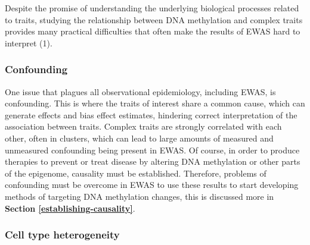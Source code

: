 \documentclass[11pt,oneside]{bristolthesis}
\begin{document}
Despite the promise of understanding the underlying biological processes related to traits, studying the relationship between DNA methylation and complex traits provides many practical difficulties that often make the results of EWAS hard to interpret (1).

\hypertarget{confounding}{%
\subsubsection{Confounding}\label{confounding}}

One issue that plagues all observational epidemiology, including EWAS, is confounding. This is where the traits of interest share a common cause, which can generate effects and bias effect estimates, hindering correct interpretation of the association between traits. Complex traits are strongly correlated with each other, often in clusters, which can lead to large amounts of measured and unmeasured confounding being present in EWAS. Of course, in order to produce therapies to prevent or treat disease by altering DNA methylation or other parts of the epigenome, causality must be established. Therefore, problems of confounding must be overcome in EWAS to use these results to start developing methods of targeting DNA methylation changes, this is discussed more in \textbf{Section \ref{establishing-causality}}.

\hypertarget{cell-type-heterogeneity}{%
\subsubsection{Cell type heterogeneity}\label{cell-type-heterogeneity}}
\end{document}

